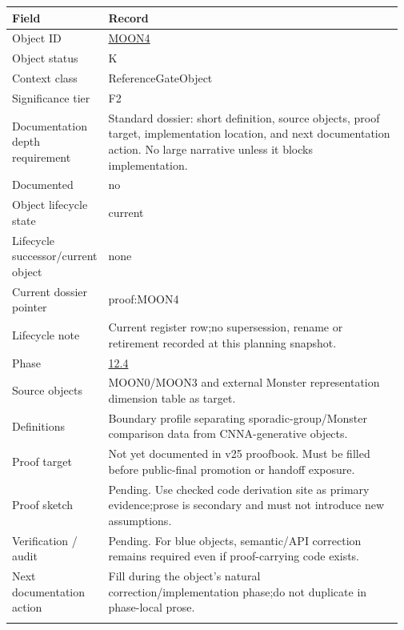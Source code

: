 \begin{longtable}{L{0.16\linewidth} L{0.81\linewidth}}
\hline
\textbf{Field} & \textbf{Record}\\
\hline
Object ID & \hyperlink{object-row-MOON4}{MOON4}\\
\hline\addlinespace[0.20em]
Object status & K\\
\hline\addlinespace[0.20em]
Context class & ReferenceGateObject\\
\hline\addlinespace[0.20em]
Significance tier & F2\\
\hline\addlinespace[0.20em]
Documentation depth requirement & Standard dossier: short definition, source objects, proof target, implementation location, and next documentation action. No large narrative unless it blocks implementation.\\
\hline\addlinespace[0.20em]
Documented & no\\
\hline\addlinespace[0.20em]
Object lifecycle state & current\\
\hline\addlinespace[0.20em]
Lifecycle successor/\allowbreak{}current object & none\\
\hline\addlinespace[0.20em]
Current dossier pointer & proof:MOON4\\
\hline\addlinespace[0.20em]
Lifecycle note & Current register row;\newline no supersession, rename or retirement recorded at this planning snapshot.\\
\hline\addlinespace[0.20em]
Phase & \hyperlink{phase-row-12-4}{12.4}\\
\hline\addlinespace[0.20em]
Source objects & MOON0/\allowbreak{}MOON3 and external Monster representation dimension table as target.\\
\hline\addlinespace[0.20em]
Definitions & Boundary profile separating sporadic-group/\allowbreak{}Monster comparison data from CNNA-generative objects.\\
\hline\addlinespace[0.20em]
Proof target & Not yet documented in v25 proofbook. Must be filled before public-final promotion or handoff exposure.\\
\hline\addlinespace[0.20em]
Proof sketch & Pending. Use checked code derivation site as primary evidence;\newline prose is secondary and must not introduce new assumptions.\\
\hline\addlinespace[0.20em]
Verification /\allowbreak{} audit & Pending. For blue objects, semantic/\allowbreak{}API correction remains required even if proof-carrying code exists.\\
\hline\addlinespace[0.20em]
Next documentation action & Fill during the object's natural correction/\allowbreak{}implementation phase;\newline do not duplicate in phase-local prose.\\
\hline\addlinespace[0.20em]
\end{longtable}
